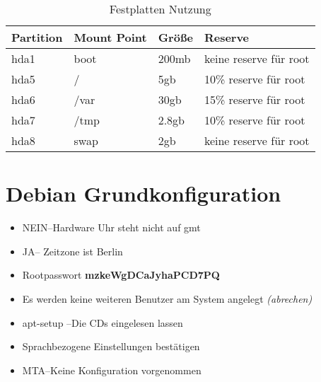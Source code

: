 \begin{table}[htbp]
\begin{center}
\begin{tabular*}{0.95\textwidth}{p{}p{}p{}p{}}
\hline
\textbf{Partition} & \textbf{Mount Point} & \textbf{Größe} & \textbf{Reserve} \\
\hline
hda1 & boot & 200mb & keine reserve für root \\
hda5 & / & 5gb & 10\%  reserve für root \\
hda6 & /var & 30gb & 15\%  reserve für root \\
hda7 & /tmp & 2.8gb & 10\%  reserve für root \\
hda8 & swap & 2gb & keine reserve für root \\
\hline
\end{tabular*}
\caption{Festplatten Nutzung}
\label{table:Festplatten Nutzung}
\end{center}
\end{table}


\section{Debian Grundkonfiguration}
\label{section:Debian Grundkonfiguration}

\begin{itemize}
\item \glqq NEIN\grqq --Hardware Uhr steht nicht auf gmt
\item \glqq JA\grqq -- Zeitzone ist Berlin
\item Rootpasswort \textbf{mzkeWgDCaJyhaPCD7PQ}
\item Es werden keine weiteren Benutzer am System angelegt \textit{(abrechen)}
\item apt-setup   --Die CDs eingelesen lassen
\item Sprachbezogene Einstellungen bestätigen
\item \glqq MTA\grqq  --Keine Konfiguration vorgenommen 
\end{itemize}
